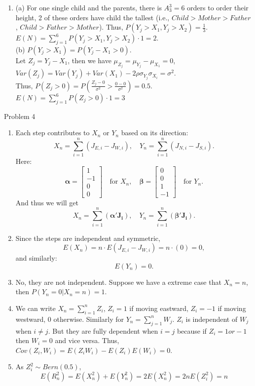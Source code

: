 \documentclass[12pt,letterpaper, onecolumn]{exam}
\begin{document}
\begin{questions}
\begin{solution}
\begin{enumerate}
        \item (a) For one single child and the parents, there is $A_3^3 = 6$ orders to order their height, 2 of these orders have child the tallest (i.e., $Child>Mother>Father$, $Child>Father>Mother$). Thus, $P(Y_j>X_1, Y_j>X_2) = \frac{1}{3}$. $E(N) = \sum_{j=1}^6 P(Y_j>X_1, Y_j>X_2) \cdot 1 = 2$. \\
        (b) $P(Y_j>X_1) = P(Y_j-X_1 > 0 )$.\\
        Let $Z_j = Y_j - X_1$, then we have $\mu_{Z_j} = \mu_{Y_j} - \mu_{X_1} = 0$, \\
        $Var(Z_j) = Var(Y_j) + Var(X_1) - 2\rho\sigma_{Y_j}\sigma_{X_i} = \sigma^2$. \\
        Thus, $P(Z_j>0) = P(\frac{Z_j-0}{\sigma^2} > \frac{0-0}{\sigma^2}) = 0.5$. $E(N) = \sum_{j=1}^6 P(Z_j>0) \cdot 1 = 3$
    \end{enumerate}
    \end{solution}
    \question Problem 4
    \begin{solution}
    \begin{enumerate}
        \item Each step contributes to $X_n$ or $Y_n$ based on its direction:
        \[
        X_n = \sum_{i=1}^n (J_{E,i} - J_{W,i}), \quad Y_n = \sum_{i=1}^n (J_{N,i} - J_{S,i}).
        \]
        Here:
        \[
        \mathbf{\alpha} = 
        \begin{bmatrix}
        1 \\ -1 \\ 0 \\ 0
        \end{bmatrix} \quad \text{for } X_n, \quad 
        \mathbf{\beta} = 
        \begin{bmatrix}
        0 \\ 0 \\ 1 \\ -1
        \end{bmatrix} \quad \text{for } Y_n.
        \]
        And thus we will get \[
        X_n = \sum_{i=1}^n (\mathbf{\alpha'}\mathbf{J_i}), \quad Y_n = \sum_{i=1}^n (\mathbf{\beta'}\mathbf{J_i}).
        \]
        \item Since the steps are independent and symmetric,
        \[
        E(X_n) = n \cdot E(J_{E,i} - J_{W,i}) = n \cdot (0) = 0,
        \]
        and similarly:
        \[
        E(Y_n) = 0.
        \]
        \item No, they are not independent. Suppose we have a extreme case that $X_n = n$, then $P(Y_n = 0|X_n = n) = 1$.
        \item We can write $X_n = \sum_{i=1}^n Z_i$, $Z_i = 1$ if moving eastward, $Z_i = -1$ if moving westward, 0 otherwise. Similarly for $Y_n  = \sum_{j=1}^n W_j$. $Z_i$ is independent of $W_j$ when $i\neq j$. But they are fully dependent when $i=j$ because if $Z_i = 1 or -1$ then $W_i = 0$ and vice versa. Thus, $Cov(Z_i, W_i) = E(Z_i W_i)-E(Z_i)E(W_i) = 0$.
        \item  As $Z_i^2 \sim Bern (0.5)$,
        $$E(R_n^2) = E(X_n^2)+E(Y_n^2) = 2E(X_n^2) = 2nE(Z_i^2) = n$$
        

\end{enumerate}
\end{solution}
\end{questions}
\end{document}
